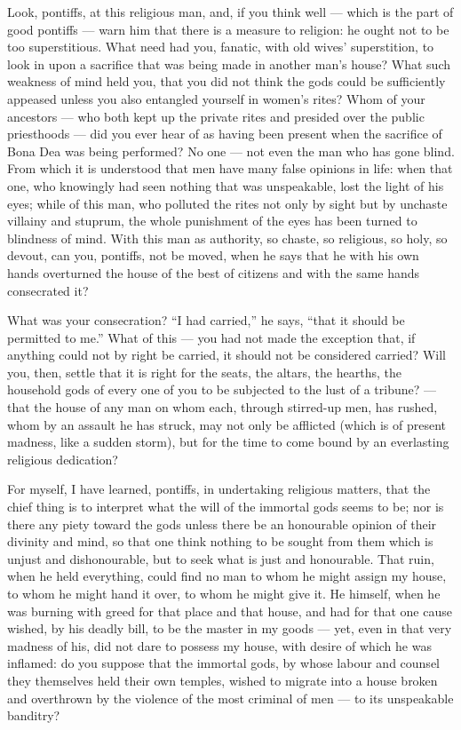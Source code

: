  Look, pontiffs, at this religious man, and, if you think well --- which is the part of good pontiffs --- warn him that there is a measure to religion: he ought not to be too superstitious. What need had you, fanatic, with old wives' superstition, to look in upon a sacrifice that was being made in another man's house? What such weakness of mind held you, that you did not think the gods could be sufficiently appeased unless you also entangled yourself in women's rites? Whom of your ancestors --- who both kept up the private rites and presided over the public priesthoods --- did you ever hear of as having been present when the sacrifice of Bona Dea was being performed? No one --- not even the man who has gone blind. From which it is understood that men have many false opinions in life: when that one, who knowingly had seen nothing that was unspeakable, lost the light of his eyes; while of this man, who polluted the rites not only by sight but by unchaste villainy and stuprum, the whole punishment of the eyes has been turned to blindness of mind. With this man as authority, so chaste, so religious, so holy, so devout, can you, pontiffs, not be moved, when he says that he with his own hands overturned the house of the best of citizens and with the same hands consecrated it?

 What was your consecration? ``I had carried,'' he says, ``that it should be permitted to me.'' What of this --- you had not made the exception that, if anything could not by right be carried, it should not be considered carried? Will you, then, settle that it is right for the seats, the altars, the hearths, the household gods of every one of you to be subjected to the lust of a tribune? --- that the house of any man on whom each, through stirred-up men, has rushed, whom by an assault he has struck, may not only be afflicted (which is of present madness, like a sudden storm), but for the time to come bound by an everlasting religious dedication?

 For myself, I have learned, pontiffs, in undertaking religious matters, that the chief thing is to interpret what the will of the immortal gods seems to be; nor is there any piety toward the gods unless there be an honourable opinion of their divinity and mind, so that one think nothing to be sought from them which is unjust and dishonourable, but to seek what is just and honourable. That ruin, when he held everything, could find no man to whom he might assign my house, to whom he might hand it over, to whom he might give it. He himself, when he was burning with greed for that place and that house, and had for that one cause wished, by his deadly bill, to be the master in my goods --- yet, even in that very madness of his, did not dare to possess my house, with desire of which he was inflamed: do you suppose that the immortal gods, by whose labour and counsel they themselves held their own temples, wished to migrate into a house broken and overthrown by the violence of the most criminal of men --- to its unspeakable banditry?

